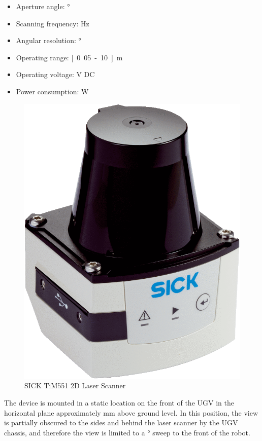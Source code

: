 \documentclass[titlepage,12pt,a4paper]{article}
\begin{document}
\begin{itemize}
	\item Aperture angle: \unit[270]{\degree}
	\item Scanning frequency: \unit[15]{Hz}
	\item Angular resolution: \unit[1]{\degree}
	\item Operating range: \unit[0.05-10]{m}
	\item Operating voltage: \unit[9-28]{V} DC
	\item Power consumption: \unit[3]{W}
\end{itemize}
\begin{figure}[h!]
	\centering
	
	\includegraphics[scale=0.2]{figures/sick_lidar.png}
	\caption{SICK TiM551 2D Laser Scanner}
	\label{figure:sick_lidar}
\end{figure}

The device is mounted in a static location on the front of the UGV in the horizontal plane approximately \unit[300]{mm} above ground level. In this position, the view is partially obscured to the sides and behind the laser scanner by the UGV chassis, and therefore the view is limited to a \unit[150]{\degree} sweep to the front of the robot.
\pagebreak
\end{document}

